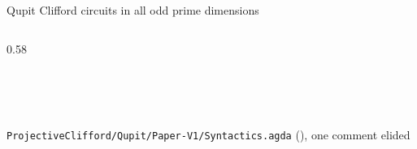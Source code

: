\begin{frame}{Qupit Clifford circuits in all odd prime dimensions \New}
\begin{columns}[c]
\begin{column}{0.58\textwidth}
\begin{code}
\AgdaSpace{}%
\AgdaOperator{\AgdaDatatype{===}}\AgdaSpace{}%
\<%
\\
%
\>[2]\AgdaSpace{}%
\AgdaSymbol{:}%
\>[18]\AgdaSymbol{(}\AgdaSpace{}%
\AgdaSymbol{)}\AgdaSpace{}%
%
\>[32]\AgdaSpace{}%
\AgdaSpace{}%
\AgdaSpace{}%
\AgdaSpace{}%
\AgdaSpace{}%
\AgdaSpace{}%
\AgdaSpace{}%
\AgdaSpace{}%
\AgdaOperator{\AgdaDatatype{===}}\AgdaSpace{}%
\AgdaSpace{}%
\AgdaSpace{}%
\AgdaSpace{}%
\AgdaSpace{}%
\AgdaSpace{}%
\AgdaSpace{}%
\AgdaSpace{}%
\<%
\\
%
\>[2]\AgdaSpace{}%
\AgdaSymbol{:}%
\>[18]\AgdaSymbol{(}\AgdaSpace{}%
\AgdaSymbol{)}\AgdaSpace{}%
%
\>[32]\AgdaSpace{}%
\AgdaSpace{}%
\AgdaSpace{}%
\AgdaSpace{}%
\AgdaSpace{}%
\AgdaSpace{}%
\AgdaSpace{}%
\AgdaOperator{\AgdaDatatype{===}}\AgdaSpace{}%
\AgdaSpace{}%
\AgdaSpace{}%
\AgdaSpace{}%
\AgdaSpace{}%
\AgdaSpace{}%
\AgdaSpace{}%
\AgdaSpace{}%
\<%
\\
%
\>[2]\AgdaSpace{}%
\AgdaSymbol{:}%
\>[18]\AgdaSymbol{(}\AgdaSpace{}%
\AgdaSymbol{)}\AgdaSpace{}%
%
\>[32]\AgdaSpace{}%
\AgdaSpace{}%
\AgdaSpace{}%
\AgdaSpace{}%
\AgdaSpace{}%
\AgdaOperator{\AgdaDatatype{===}}\AgdaSpace{}%
\AgdaSpace{}%
\AgdaSpace{}%
\AgdaSpace{}%
\AgdaSpace{}%
\AgdaSpace{}%
\AgdaSpace{}%
\<%
\end{code}
{\scriptsize \texttt{ProjectiveClifford/Qupit/Paper-V1/Syntactics.agda} (), one comment elided}
\end{column}
\end{columns}
\end{frame}

